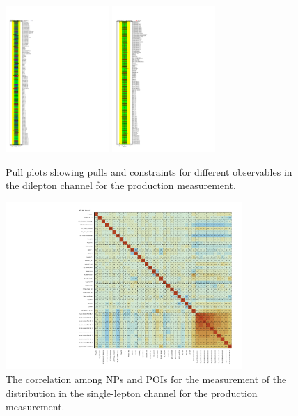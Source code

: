 \begin{figure}[ht]
  \centering
  \includegraphics[width=0.35\textwidth]{figures/diff_xsec/dilep_tty_prod_mu_blinded/compare_NP_pulls/compare_NP_dilep_fits_detall_dphill_eta/NuisPar_comp.pdf}%
  \includegraphics[width=0.35\textwidth]{figures/diff_xsec/dilep_tty_prod_mu_blinded/compare_NP_pulls/compare_NP_dilep_fits_drphb_drlj/NuisPar_comp.pdf}%
  \caption{Pull plots showing pulls and constraints for different observables in the dilepton channel for the \tty production measurement.}
  \label{fig:pull_plot_pt_tty_dec_free_dilep_mu_blinded_2}
\end{figure}
\FloatBarrier

\begin{figure}[ht]
  \centering
  \includegraphics[width=0.8\textwidth]{figures/diff_xsec/ljet_tty_prod_mu_blinded/correlations/tty1l_pt_all_syst/CorrMatrix.pdf}
  \caption{The correlation among NPs and POIs for the measurement of the \ptgamma distribution in the single-lepton channel for the \tty production measurement.}
  \label{fig:NP_corr_ljet_mu_blinded}
\end{figure}
\FloatBarrier


